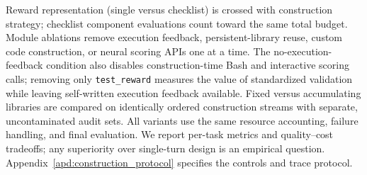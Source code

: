 Reward representation (single versus checklist) is crossed with construction strategy; checklist component evaluations count toward the same total budget. Module ablations remove execution feedback, persistent-library reuse, custom code construction, or neural scoring APIs one at a time. The no-execution-feedback condition also disables construction-time Bash and interactive scoring calls; removing only \texttt{test\_reward} measures the value of standardized validation while leaving self-written execution feedback available. Fixed versus accumulating libraries are compared on identically ordered construction streams with separate, uncontaminated audit sets. All variants use the same resource accounting, failure handling, and final evaluation. We report per-task metrics and quality--cost tradeoffs; any superiority over single-turn design is an empirical question. Appendix~\ref{apd:construction_protocol} specifies the controls and trace protocol.
